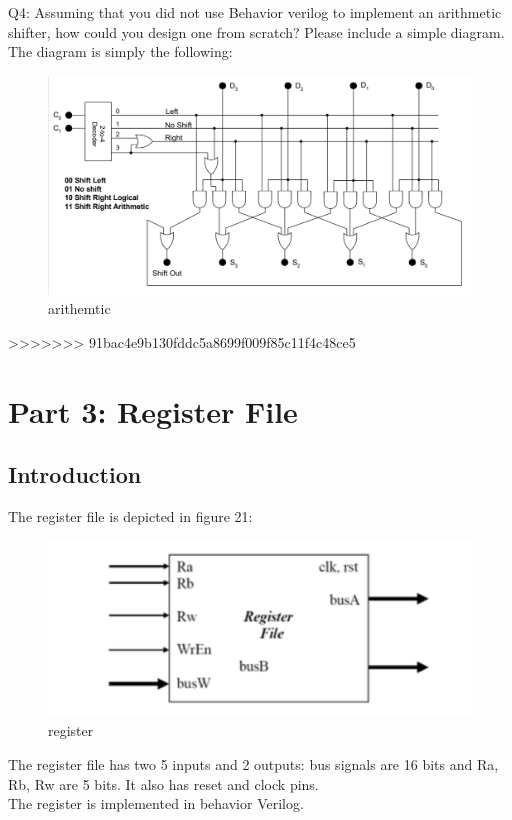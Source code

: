\documentclass{article}
\begin{document}
Q4: Assuming that you did not use Behavior verilog to implement an arithmetic shifter, how could you design one from scratch? Please include a simple diagram.\\
The diagram is simply the following: 
\begin{figure}[!htb]
  \centering
  \includegraphics[width=\linewidth]{arithmetic_shift.png}
  \caption{arithemtic}
  \label{fig:arithemtic shift}
\end{figure}












>>>>>>> 91bac4e9b130fddc5a8699f009f85c11f4c48ce5



\section{Part 3: Register File }
\subsection{Introduction}
The register file is depicted in figure 21: \\
\begin{figure}[!htb]
  \centering
  \includegraphics[width=\linewidth]{reg.png}
  \caption{register}
  \label{fig:reg}
\end{figure}
The register file has two 5 inputs and 2 outputs: bus signals are 16 bits and Ra, Rb, Rw are 5 bits. It also has reset and clock pins. \\
The register is implemented in behavior Verilog. 
\end{document}
